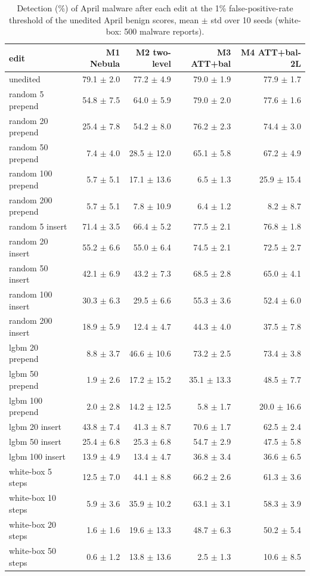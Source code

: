\begin{table}[t]
\centering
\small
\caption{Detection (\%) of April malware after each edit at the 1\% false-positive-rate threshold of the unedited April benign scores, mean $\pm$ std over 10 seeds (white-box: 500 malware reports).}
\label{tab:T5a_attack_detection_1pct}
\begin{tabular}{lrrrr}
\toprule
edit & M1 Nebula & M2 two-level & M3 ATT+bal & M4 ATT+bal-2L \\
\midrule
unedited & 79.1 $\pm$ 2.0 & 77.2 $\pm$ 4.9 & 79.0 $\pm$ 1.9 & 77.9 $\pm$ 1.7 \\
random 5 prepend & 54.8 $\pm$ 7.5 & 64.0 $\pm$ 5.9 & 79.0 $\pm$ 2.0 & 77.6 $\pm$ 1.6 \\
random 20 prepend & 25.4 $\pm$ 7.8 & 54.2 $\pm$ 8.0 & 76.2 $\pm$ 2.3 & 74.4 $\pm$ 3.0 \\
random 50 prepend & 7.4 $\pm$ 4.0 & 28.5 $\pm$ 12.0 & 65.1 $\pm$ 5.8 & 67.2 $\pm$ 4.9 \\
random 100 prepend & 5.7 $\pm$ 5.1 & 17.1 $\pm$ 13.6 & 6.5 $\pm$ 1.3 & 25.9 $\pm$ 15.4 \\
random 200 prepend & 5.7 $\pm$ 5.1 & 7.8 $\pm$ 10.9 & 6.4 $\pm$ 1.2 & 8.2 $\pm$ 8.7 \\
random 5 insert & 71.4 $\pm$ 3.5 & 66.4 $\pm$ 5.2 & 77.5 $\pm$ 2.1 & 76.8 $\pm$ 1.8 \\
random 20 insert & 55.2 $\pm$ 6.6 & 55.0 $\pm$ 6.4 & 74.5 $\pm$ 2.1 & 72.5 $\pm$ 2.7 \\
random 50 insert & 42.1 $\pm$ 6.9 & 43.2 $\pm$ 7.3 & 68.5 $\pm$ 2.8 & 65.0 $\pm$ 4.1 \\
random 100 insert & 30.3 $\pm$ 6.3 & 29.5 $\pm$ 6.6 & 55.3 $\pm$ 3.6 & 52.4 $\pm$ 6.0 \\
random 200 insert & 18.9 $\pm$ 5.9 & 12.4 $\pm$ 4.7 & 44.3 $\pm$ 4.0 & 37.5 $\pm$ 7.8 \\
lgbm 20 prepend & 8.8 $\pm$ 3.7 & 46.6 $\pm$ 10.6 & 73.2 $\pm$ 2.5 & 73.4 $\pm$ 3.8 \\
lgbm 50 prepend & 1.9 $\pm$ 2.6 & 17.2 $\pm$ 15.2 & 35.1 $\pm$ 13.3 & 48.5 $\pm$ 7.7 \\
lgbm 100 prepend & 2.0 $\pm$ 2.8 & 14.2 $\pm$ 12.5 & 5.8 $\pm$ 1.7 & 20.0 $\pm$ 16.6 \\
lgbm 20 insert & 43.8 $\pm$ 7.4 & 41.3 $\pm$ 8.7 & 70.6 $\pm$ 1.7 & 62.5 $\pm$ 2.4 \\
lgbm 50 insert & 25.4 $\pm$ 6.8 & 25.3 $\pm$ 6.8 & 54.7 $\pm$ 2.9 & 47.5 $\pm$ 5.8 \\
lgbm 100 insert & 13.9 $\pm$ 4.9 & 13.4 $\pm$ 4.7 & 36.8 $\pm$ 3.4 & 36.6 $\pm$ 6.5 \\
white-box 5 steps & 12.5 $\pm$ 7.0 & 44.1 $\pm$ 8.8 & 66.2 $\pm$ 2.6 & 61.3 $\pm$ 3.6 \\
white-box 10 steps & 5.9 $\pm$ 3.6 & 35.9 $\pm$ 10.2 & 63.1 $\pm$ 3.1 & 58.3 $\pm$ 3.9 \\
white-box 20 steps & 1.6 $\pm$ 1.6 & 19.6 $\pm$ 13.3 & 48.7 $\pm$ 6.3 & 50.2 $\pm$ 5.4 \\
white-box 50 steps & 0.6 $\pm$ 1.2 & 13.8 $\pm$ 13.6 & 2.5 $\pm$ 1.3 & 10.6 $\pm$ 8.5 \\
\bottomrule
\end{tabular}
\end{table}
